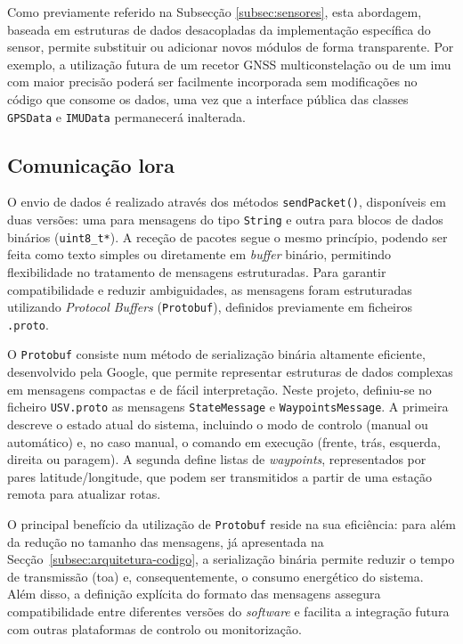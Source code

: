 Como previamente referido na Subsecção \ref{subsec:sensores}, esta abordagem, baseada em estruturas de dados desacopladas da implementação específica do sensor, permite substituir ou adicionar novos módulos de forma transparente. Por exemplo, a utilização futura de um recetor GNSS multiconstelação ou de um \gls{imu} com maior precisão poderá ser facilmente incorporada sem modificações no código que consome os dados, uma vez que a interface pública das classes \texttt{GPSData} e \texttt{IMUData} permanecerá inalterada.

\subsection{Comunicação \acrfull{lora}}
\label{subsec:comunicacao-lora}

O envio de dados é realizado através dos métodos \texttt{sendPacket()}, disponíveis em duas versões: uma para mensagens do tipo \texttt{String} e outra para blocos de dados binários (\texttt{uint8\_t*}). A receção de pacotes segue o mesmo princípio, podendo ser feita como texto simples ou diretamente em \emph{buffer} binário, permitindo flexibilidade no tratamento de mensagens estruturadas. Para garantir compatibilidade e reduzir ambiguidades, as mensagens foram estruturadas utilizando \emph{Protocol Buffers} (\texttt{Protobuf}), definidos previamente em ficheiros \texttt{.proto}.  

O \texttt{Protobuf} \cite{google-protobuf} consiste num método de serialização binária altamente eficiente, desenvolvido pela Google, que permite representar estruturas de dados complexas em mensagens compactas e de fácil interpretação. Neste projeto, definiu-se no ficheiro \texttt{USV.proto} as mensagens \texttt{StateMessage} e \texttt{WaypointsMessage}. A primeira descreve o estado atual do sistema, incluindo o modo de controlo (manual ou automático) e, no caso manual, o comando em execução (frente, trás, esquerda, direita ou paragem). A segunda define listas de \emph{waypoints}, representados por pares latitude/longitude, que podem ser transmitidos a partir de uma estação remota para atualizar rotas.  

O principal benefício da utilização de \texttt{Protobuf} reside na sua eficiência: para além da redução no tamanho das mensagens, já apresentada na Secção~\ref{subsec:arquitetura-codigo}, a serialização binária permite reduzir o tempo de transmissão (\gls{toa}) e, consequentemente, o consumo energético do sistema. Além disso, a definição explícita do formato das mensagens assegura compatibilidade entre diferentes versões do \emph{software} e facilita a integração futura com outras plataformas de controlo ou monitorização.  

